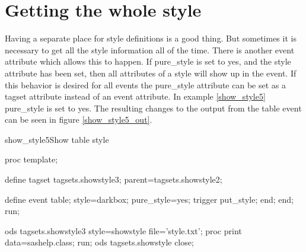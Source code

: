 
\section{Getting the whole style}       
Having a separate place for style definitions is a good thing.  But
sometimes it is necessary to get all the style information all of the
time.  There is another event attribute which allows this to happen.
If pure\_style is set to yes, and the style attribute has been set,
then all attributes of a style will show up in the event.  If this
behavior is desired for all events the pure\_style attribute can be
set as a tagset attribute instead of an event attribute.
In example \vref{show_style5}
pure\_style is set to yes.  The resulting changes to the output from
the table event can be seen in 
figure \vref{show_style5_out}.

\begin{fvcode}{show_style5}{Show table style}

proc template;

    define tagset tagsets.showstyle3;
        parent=tagsets.showstyle2;

        define event table;
           style=darkbox;
           pure_style=yes;
           trigger put_style;
        end;
    end;
run;

ods tagsets.showstyle3 style=showstyle file='style.txt';
proc print data=sashelp.class; run;
ods tagsets.showstyle close;
\end{fvcode}

